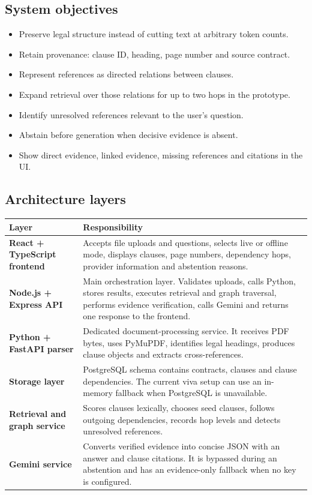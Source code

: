 \documentclass[11pt,letterpaper]{article}
\begin{document}
\subsection{System objectives}
\begin{itemize}
  \item Preserve legal structure instead of cutting text at arbitrary token counts.
  \item Retain provenance: clause ID, heading, page number and source contract.
  \item Represent references as directed relations between clauses.
  \item Expand retrieval over those relations for up to two hops in the prototype.
  \item Identify unresolved references relevant to the user's question.
  \item Abstain before generation when decisive evidence is absent.
  \item Show direct evidence, linked evidence, missing references and citations in the UI.
\end{itemize}

\subsection{Architecture layers}
\begin{longtable}{>{\bfseries}p{}p{}}
\toprule
Layer & Responsibility\\
\midrule
React + TypeScript frontend & Accepts file uploads and questions, selects live or offline mode, displays clauses, page numbers, dependency hops, provider information and abstention reasons.\\
Node.js + Express API & Main orchestration layer. Validates uploads, calls Python, stores results, executes retrieval and graph traversal, performs evidence verification, calls Gemini and returns one response to the frontend.\\
Python + FastAPI parser & Dedicated document-processing service. It receives PDF bytes, uses PyMuPDF, identifies legal headings, produces clause objects and extracts cross-references.\\
Storage layer & PostgreSQL schema contains contracts, clauses and clause dependencies. The current viva setup can use an in-memory fallback when PostgreSQL is unavailable.\\
Retrieval and graph service & Scores clauses lexically, chooses seed clauses, follows outgoing dependencies, records hop levels and detects unresolved references.\\
Gemini service & Converts verified evidence into concise JSON with an answer and clause citations. It is bypassed during an abstention and has an evidence-only fallback when no key is configured.\\
\bottomrule
\end{longtable}
\end{document}
